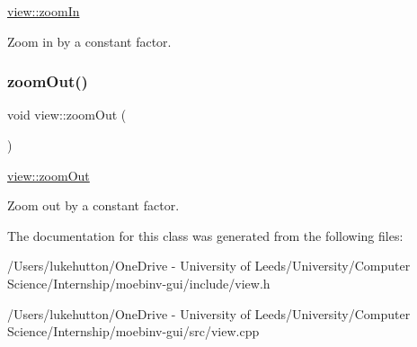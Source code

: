 \mbox{\hyperlink{classview_af0f530013cb69c332de83d47d75a8fb0}{view\+::zoom\+In}} 

Zoom in by a constant factor. \mbox{\label{classview_a497e42c804c9937d94b373d53e163f1b}} 
\subsubsection{\texorpdfstring{zoom\+Out()}{zoomOut()}}
{\footnotesize\ttfamily void view\+::zoom\+Out (\begin{DoxyParamCaption}{ }\end{DoxyParamCaption})}



\mbox{\hyperlink{classview_a497e42c804c9937d94b373d53e163f1b}{view\+::zoom\+Out}} 

Zoom out by a constant factor. 

The documentation for this class was generated from the following files\+:\begin{DoxyCompactItemize}
\item 
/\+Users/lukehutton/\+One\+Drive -\/ University of Leeds/\+University/\+Computer Science/\+Internship/moebinv-\/gui/include/view.\+h\item 
/\+Users/lukehutton/\+One\+Drive -\/ University of Leeds/\+University/\+Computer Science/\+Internship/moebinv-\/gui/src/view.\+cpp\end{DoxyCompactItemize}
